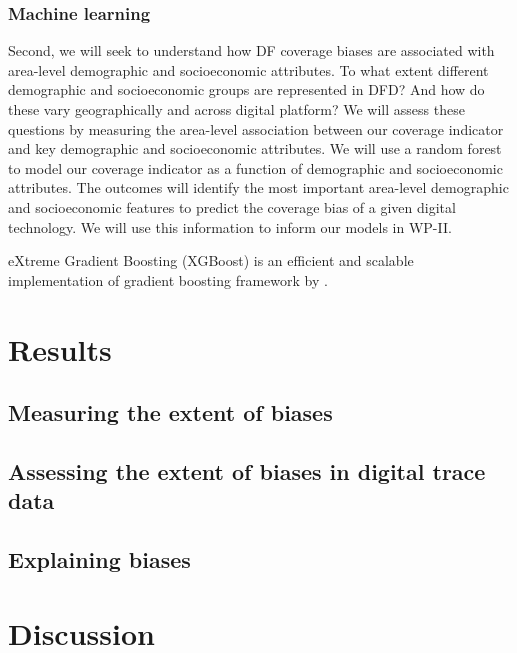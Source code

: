 \documentclass[]{rsos}%
\begin{document}
\subsubsection{Machine learning}\label{machine-learning}

Second, we will seek to understand how DF coverage biases are associated with area-level
demographic and socioeconomic attributes. To what extent different demographic and socioeconomic
groups are represented in DFD? And how do these vary geographically and across digital platform?
We will assess these questions by measuring the area-level association between our coverage
indicator and key demographic and socioeconomic attributes. We will use a random forest to model
our coverage indicator as a function of demographic and socioeconomic attributes. The outcomes will
identify the most important area-level demographic and socioeconomic features to predict the
coverage bias of a given digital technology. We will use this information to inform our models in WP-II.

eXtreme Gradient Boosting (XGBoost) is an efficient and scalable implementation of gradient boosting framework by \citep{friedman2001, friedman2000}.

\section{Results}\label{results}

\subsection{Measuring the extent of biases}\label{measuring-the-extent-of-biases}

\subsection{Assessing the extent of biases in digital trace data}\label{assessing-the-extent-of-biases-in-digital-trace-data}

\subsection{Explaining biases}\label{explaining-biases}

\section{Discussion}\label{discussion}
\end{document}

